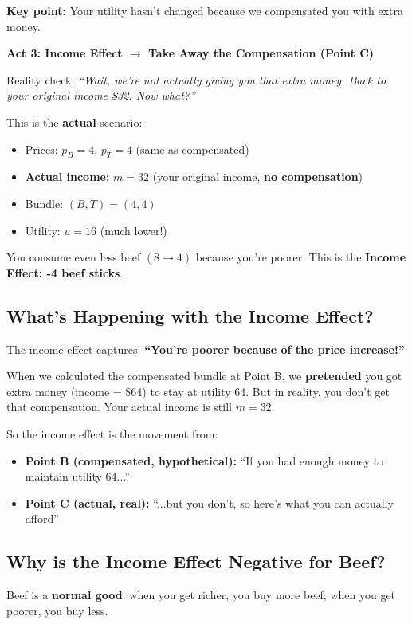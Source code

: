 \documentclass[11pt]{article}
\begin{document}
\textbf{Key point:} Your utility hasn't changed because we compensated you with extra money.

\textbf{Act 3: Income Effect $\to$ Take Away the Compensation (Point C)}

Reality check: \textit{``Wait, we're not actually giving you that extra money. Back to your original income \$32. Now what?''}

This is the \textbf{actual} scenario:
\begin{itemize}
    \item Prices: $p_B = 4$, $p_T = 4$ (same as compensated)
    \item \textbf{Actual income:} $m = 32$ (your original income, \textbf{no compensation})
    \item Bundle: $(B, T) = (4, 4)$
    \item Utility: $u = 16$ (much lower!)
\end{itemize}

You consume even less beef $(8 \to 4)$ because you're poorer. This is the \textbf{Income Effect: -4 beef sticks}.

\subsection{What's Happening with the Income Effect?}

The income effect captures: \textbf{``You're poorer because of the price increase!''}

When we calculated the compensated bundle at Point B, we \textbf{pretended} you got extra money (income = \$64) to stay at utility 64. But in reality, you don't get that compensation. Your actual income is still $m = 32$.

So the income effect is the movement from:
\begin{itemize}
    \item \textbf{Point B (compensated, hypothetical):} ``If you had enough money to maintain utility 64...''
    \item \textbf{Point C (actual, real):} ``...but you don't, so here's what you can actually afford''
\end{itemize}

\subsection{Why is the Income Effect Negative for Beef?}

Beef is a \textbf{normal good}: when you get richer, you buy more beef; when you get poorer, you buy less.
\end{document}
